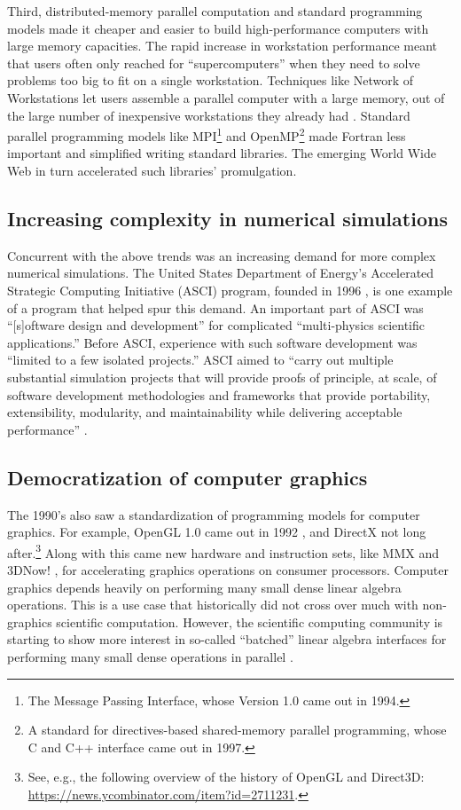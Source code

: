Third, distributed-memory parallel computation and standard
programming models made it cheaper and easier to build
high-performance computers with large memory capacities.  The rapid
increase in workstation performance meant that users often only
reached for ``supercomputers'' when they need to solve problems too
big to fit on a single workstation.  Techniques like Network of
Workstations let users assemble a parallel computer with a large
memory, out of the large number of inexpensive workstations they
already had \cite{anderson1995case}.  Standard parallel programming
models like MPI\footnote{The Message Passing Interface, whose Version
  1.0 came out in 1994.} and OpenMP\footnote{A standard for
  directives-based shared-memory parallel programming, whose C and C++
  interface came out in 1997.} made Fortran less important and
simplified writing standard libraries.  The emerging World Wide Web in
turn accelerated such libraries' promulgation.

\subsection{Increasing complexity in numerical simulations}
\label{SS:90s:multiphysics}

Concurrent with the above trends was an increasing demand for more
complex numerical simulations.  The United States Department of
Energy's Accelerated Strategic Computing Initiative (ASCI) program,
founded in 1996 \cite{messina1996asci}, is one example of a program
that helped spur this demand.  An important part of ASCI was
``[s]oftware design and development'' for complicated ``multi-physics
scientific applications.''  Before ASCI, experience with such software
development was ``limited to a few isolated projects.''  ASCI aimed to
``carry out multiple substantial simulation projects that will provide
proofs of principle, at scale, of software development methodologies
and frameworks that provide portability, extensibility, modularity,
and maintainability while delivering acceptable performance''
\cite{messina1996asci}.

\subsection{Democratization of computer graphics}
\label{SS:90s:graphics}

The 1990's also saw a standardization of programming models for
computer graphics.  For example, OpenGL 1.0 came out in 1992
\cite{OpenGL-history}, and DirectX not long after.\footnote{See, e.g.,
  the following overview of the history of OpenGL and Direct3D:
  \url{https://news.ycombinator.com/item?id=2711231}.} Along with this
came new hardware and instruction sets, like MMX \cite{mittal1997mmx}
and 3DNow! \cite{oberman1999amd}, for accelerating graphics operations
on consumer processors.  Computer graphics depends heavily on
performing many small dense linear algebra operations.  This is a use
case that historically did not cross over much with non-graphics
scientific computation.  However, the scientific computing community
is starting to show more interest in so-called ``batched'' linear
algebra interfaces for performing many small dense operations in
parallel \cite{dongarra2016batched}.

